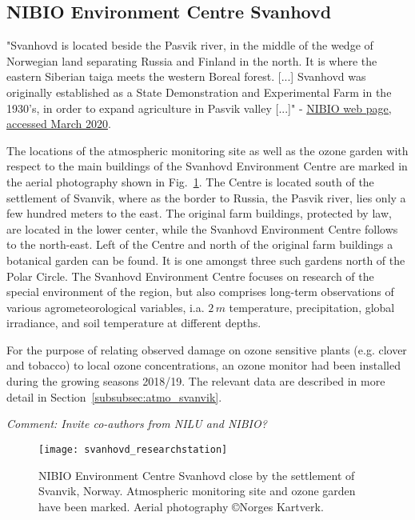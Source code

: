 \documentclass[bg, manuscript]{copernicus}
\begin{document}
\subsection{NIBIO Environment Centre Svanhovd}
\label{subsec:svanhovd}
"Svanhovd is located beside the Pasvik river, in the middle of the wedge of Norwegian land separating Russia and Finland in the north. It is where the eastern Siberian taiga meets the western Boreal forest. [...] Svanhovd was originally established as a State Demonstration and Experimental Farm in the 1930's, in order to expand agriculture in Pasvik valley [...]" - \href{https://www.nibio.no/en/about-eng/addresses/northern-norway/svanhovd}{NIBIO web page, accessed March 2020}.

The locations of the atmospheric monitoring site as well as the ozone garden with respect to the main buildings of the Svanhovd Environment Centre are marked in the aerial photography shown in Fig.~\ref{fig:svanhovd_research_station}. The Centre is located south of the settlement of Svanvik, where as the border to Russia, the Pasvik river, lies only a few hundred meters to the east. The original farm buildings, protected by law, are located in the lower center, while the Svanhovd Environment Centre follows to the north-east. Left of the Centre and north of the original farm buildings a botanical garden can be found. It is one amongst three such gardens north of the Polar Circle. The Svanhovd Environment Centre focuses on research of the special environment of the region, but also comprises long-term observations of various agrometeorological variables, i.a. $2\,\unit{m}$ temperature, precipitation, global irradiance, and soil temperature at different depths.

For the purpose of relating observed damage on ozone sensitive plants (e.g. clover and tobacco) to local ozone concentrations, an ozone monitor had been installed during the growing seasons 2018/19. The relevant data are described in more detail in Section~\ref{subsubsec:atmo_svanvik}.

\emph{Comment: Invite co-authors from NILU and NIBIO?}

\begin{figure}[t]
  \texttt{[image: svanhovd\_researchstation]}
  \caption{NIBIO Environment Centre Svanhovd close by the settlement of Svanvik, Norway. Atmospheric monitoring site and ozone garden have been marked. Aerial photography \copyright Norges Kartverk.}
  \label{fig:svanhovd_research_station}
\end{figure}
\end{document}
